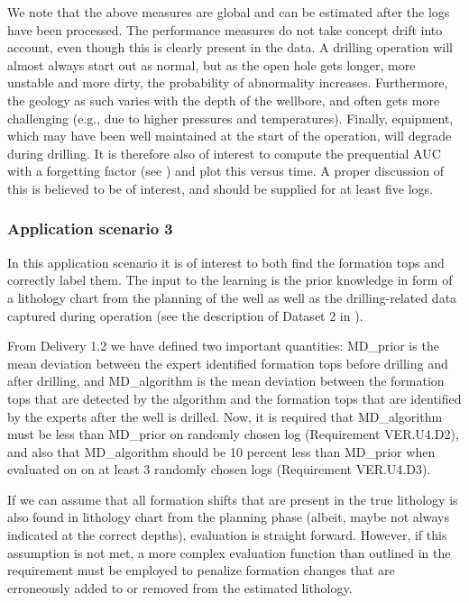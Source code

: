 We note that the above measures are global and can be estimated after the logs have been processed.  The performance measures do not take concept drift  into account, even though this is clearly present in the data.  
A drilling operation will almost always start out as normal, but as the open hole gets longer, more unstable and more dirty, the probability of abnormality increases. Furthermore, the geology as such varies with the depth of the wellbore, and  often gets more challenging (e.g., due to higher pressures and temperatures).
Finally, equipment, which may have been well maintained at the  start of the operation, will degrade during drilling.  
It is therefore also of interest to compute the prequential AUC with a forgetting factor (see ) and plot this versus time.  
A proper discussion of this is believed to be of interest, and should be supplied for at least five logs.





\subsubsection{Application scenario 3}

In this application scenario it is of interest to both find the formation tops and correctly label them.  
The input to the learning is the prior knowledge in form of a lithology chart from the planning of the well as well as the drilling-related data captured during operation  (see the description of Dataset 2 in ). 

From Delivery 1.2 we have  defined two important quantities:  MD\_prior is the mean deviation between the expert identified formation tops before drilling and after drilling, and  MD\_algorithm is the mean deviation between the formation tops that are detected by the algorithm and the formation tops that are identified by the experts after the well is drilled. 
Now, it is required that MD\_algorithm must be less than MD\_prior on  randomly chosen log (Requirement VER.U4.D2), and also that MD\_algorithm should be 10 percent less than MD\_prior when evaluated on on at least 3 randomly chosen  logs (Requirement VER.U4.D3). 

If we can assume that all formation shifts that are present in the true lithology is also found in lithology chart from the planning phase (albeit, maybe not always indicated at the correct depths), evaluation is straight forward. 
However, if this assumption is not met, a more complex evaluation function than outlined in the requirement must be employed to penalize formation changes that are erroneously added to or removed from the estimated lithology.

